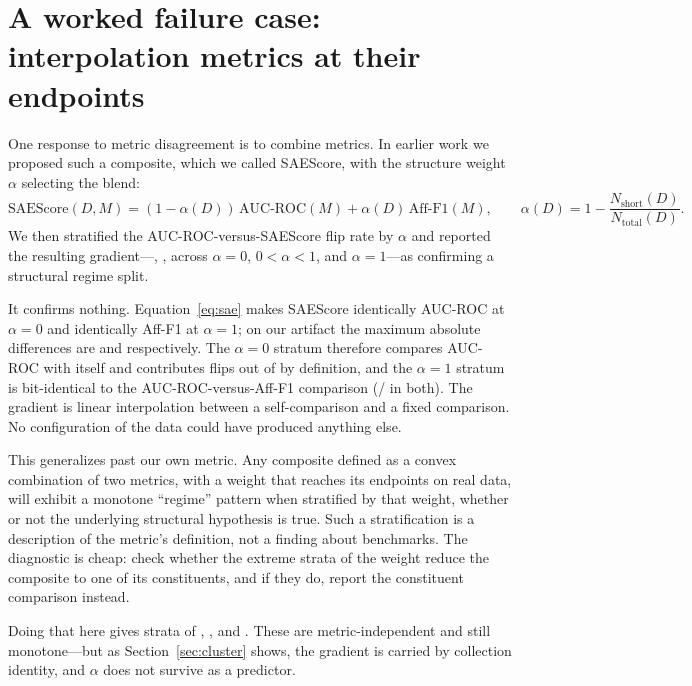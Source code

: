\documentclass[twoside,11pt]{article}
\newcommand{\afff}{\mbox{Aff-F1}}
\newcommand{\auc}{\mbox{AUC-ROC}}
\newcommand{\sae}{\mbox{SAEScore}}
\begin{document}
\section{A worked failure case: interpolation metrics at their endpoints}
\label{sec:interp}

One response to metric disagreement is to combine metrics. In earlier work we
proposed such a composite, which we called \sae{}, with the structure weight
$\alpha$ selecting the blend:
\begin{equation}
\sae{}(D, M) = (1 - \alpha(D))\,\auc{}(M) + \alpha(D)\,\afff{}(M),
\qquad \alpha(D) = 1 - \frac{N_{\text{short}}(D)}{N_{\text{total}}(D)} .
\label{eq:sae}
\end{equation}
We then stratified the \auc{}-versus-\sae{} flip rate by $\alpha$ and reported
the resulting gradient---\StratSaeAZero{}, \StratSaeAMid{}, \StratSaeAOne{}
across $\alpha = 0$, $0 < \alpha < 1$, and $\alpha = 1$---as confirming a
structural regime split.

It confirms nothing. Equation~\ref{eq:sae} makes \sae{} identically \auc{} at
$\alpha = 0$ and identically \afff{} at $\alpha = 1$; on our artifact the
maximum absolute differences are \IdentAlphaZero{} and \IdentAlphaOne{}
respectively. The $\alpha = 0$ stratum therefore compares \auc{} with itself and
contributes \StratSaeAZeroFlips{} flips out of \StratSaeAZeroPairs{} by
definition, and the $\alpha = 1$ stratum is bit-identical to the
\auc{}-versus-\afff{} comparison (\StratSaeAOneFlips/\StratSaeAOnePairs{} in
both). The gradient is linear interpolation between a self-comparison and a
fixed comparison. No configuration of the data could have produced anything
else.

This generalizes past our own metric. Any composite defined as a convex
combination of two metrics, with a weight that reaches its endpoints on real
data, will exhibit a monotone ``regime'' pattern when stratified by that weight,
whether or not the underlying structural hypothesis is true. Such a stratification
is a description of the metric's definition, not a finding about benchmarks. The
diagnostic is cheap: check whether the extreme strata of the weight reduce the
composite to one of its constituents, and if they do, report the constituent
comparison instead.

Doing that here gives strata of \StratAffAZero{}, \StratAffAMid{}, and
\StratAffAOne{}. These are metric-independent and still monotone---but as
Section~\ref{sec:cluster} shows, the gradient is carried by collection identity,
and $\alpha$ does not survive as a predictor.
\end{document}
